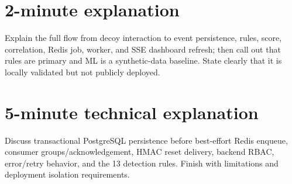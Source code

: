 \documentclass[11pt,oneside]{book}
\begin{document}
\section*{2-minute explanation}Explain the full flow from decoy interaction to event persistence, rules, score, correlation, Redis job, worker, and SSE dashboard refresh; then call out that rules are primary and ML is a synthetic-data baseline. State clearly that it is locally validated but not publicly deployed.
\section*{5-minute technical explanation}Discuss transactional PostgreSQL persistence before best-effort Redis enqueue, consumer groups/acknowledgement, HMAC reset delivery, backend RBAC, error/retry behavior, and the 13 detection rules. Finish with limitations and deployment isolation requirements.
\end{document}

